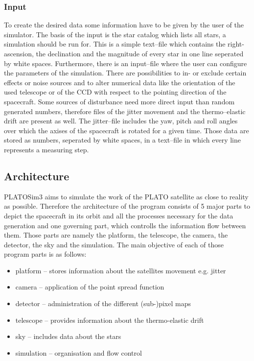 \subsubsection{Input}
To create the desired data some information have to be given by the user of the simulator. The basis of the input is the star catalog which lists all stars, a simulation should be run for. This is a simple text--file which contains the right-ascension, the declination and the magnitude of every star in one line seperated by white spaces. Furthermore, there is an input--file where the user can configure the parameters of the simulation. There are possibilities to in- or exclude certain effects or noise sources and to alter numerical data like the orientation of the used telescope or of the CCD with respect to the pointing direction of the spacecraft. Some sources of disturbance need more direct input than random generated numbers, therefore files of the jitter movement and the thermo--elastic drift are present as well. The jitter--file includes the yaw, pitch and roll angles over which the axises of the spacecraft is rotated for a given time. Those data are stored as numbers, seperated by white spaces, in a text--file in which every line represents a measuring step.    
\subsection{Architecture}
PLATOSim3 aims to simulate the work of the PLATO satellite as close to reality as possible. Therefore the architecture of the program consists of 5 major parts to depict the spacecraft in its orbit and all the processes necessary for the data generation and one governing part, which controlls the information flow between them. Those parts are namely the platform, the telescope, the camera, the detector, the sky and the simulation. The main objective of each of those program parts is as follows:

\begin{itemize}
	\item platform -- stores information about the satellites movement e.g. jitter
	\item camera -- application of the point spread function
	\item detector -- administration of the different (sub-)pixel maps
	\item telescope -- provides information about the thermo-elastic drift
	\item sky -- includes data about the stars
	\item simulation -- organisation and flow control 
\end{itemize} 


